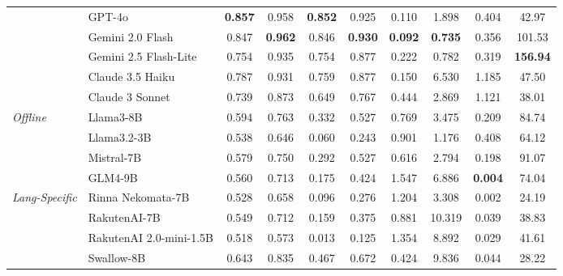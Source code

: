 \documentclass[10pt, a4paper]{article}
\begin{document}
\begin{table}[ht!]
{\begin{tabular}{l l cccccccc}
& GPT-4o & \textbf{0.857} & 0.958 & \textbf{0.852} & 0.925 & 0.110 & 1.898 & 0.404 & 42.97 \\
& Gemini 2.0 Flash & 0.847 & \textbf{0.962} & 0.846 & \textbf{0.930} & \textbf{0.092} & \textbf{0.735} & {0.356} & {101.53} \\
& Gemini 2.5 Flash-Lite & 0.754 & 0.935 & 0.754 & 0.877 & 0.222 & 0.782 & 0.319 & \textbf{156.94} \\
& Claude 3.5 Haiku & 0.787 & 0.931 & 0.759 & 0.877 & 0.150 & 6.530 & 1.185 & 47.50 \\
& Claude 3 Sonnet & 0.739 & 0.873 & 0.649 & 0.767 & 0.444 & 2.869 & 1.121 & 38.01 \\
\midrule
\textit{Offline} & Llama3-8B & 0.594 & 0.763 & 0.332 & 0.527 & 0.769 & 3.475 & 0.209 & 84.74 \\
& Llama3.2-3B & 0.538 & 0.646 & 0.060 & 0.243 & 0.901 & 1.176 & 0.408 & 64.12 \\
& Mistral-7B & 0.579 & 0.750 & 0.292 & 0.527 & 0.616 & 2.794 & 0.198 & 91.07 \\
& GLM4-9B & 0.560 & 0.713 & 0.175 & 0.424 & 1.547 & 6.886 & \textbf{0.004} & 74.04 \\
\midrule
\textit{Lang-Specific} & Rinna Nekomata-7B & 0.528 & 0.658 & 0.096 & 0.276 & 1.204 & 3.308 & 0.002 & 24.19 \\
& RakutenAI-7B & 0.549 & 0.712 & 0.159 & 0.375 & 0.881 & 10.319 & 0.039 & 38.83 \\
& RakutenAI 2.0-mini-1.5B & 0.518 & 0.573 & 0.013 & 0.125 & 1.354 & 8.892 & 0.029 & 41.61 \\
& Swallow-8B & 0.643 & 0.835 & 0.467 & 0.672 & 0.424 & 9.836 & 0.044 & 28.22 \\
\bottomrule
\end{tabular}
}
\end{table}
\end{document}
